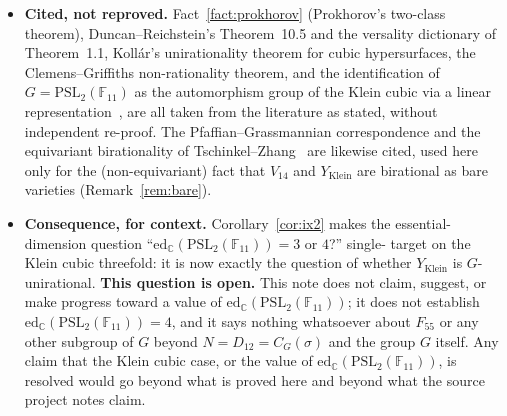 \documentclass[11pt]{article}
\theoremstyle{plain}
\theoremstyle{definition}
\theoremstyle{remark}
\newcommand{\PSL}{\mathrm{PSL}_2(\mathbb{F}_{11})}
\newcommand{\edC}{\mathrm{ed}_{\mathbb C}}
\begin{document}
\begin{itemize}
\item \textbf{Cited, not reproved.} Fact~\ref{fact:prokhorov}
(Prokhorov's two-class theorem), Duncan--Reichstein's Theorem~10.5 and
the versality dictionary of Theorem~1.1, Kollár's unirationality
theorem for cubic hypersurfaces, the Clemens--Griffiths non-rationality
theorem, and the identification of $G=\PSL$ as the automorphism group
of the Klein cubic via a linear representation~\cite{Adler}, are all
taken from the literature as stated, without independent re-proof. The
Pfaffian--Grassmannian correspondence and the equivariant birationality
of Tschinkel--Zhang~\cite{TZ} are likewise cited, used here only for
the (non-equivariant) fact that $V_{14}$ and $Y_{\mathrm{Klein}}$ are
birational as bare varieties (Remark~\ref{rem:bare}).

\item \textbf{Consequence, for context.} Corollary~\ref{cor:ix2} makes
the essential-dimension question ``$\edC(\PSL)=3$ or $4$?'' single-
target on the Klein cubic threefold: it is now exactly the question of
whether $Y_{\mathrm{Klein}}$ is $G$-unirational. \textbf{This question
is open.} This note does not claim, suggest, or make progress toward a
value of $\edC(\PSL)$; it does not establish $\edC(\PSL)=4$, and it says
nothing whatsoever about $F_{55}$ or any other subgroup of $G$ beyond
$N=D_{12}=C_G(\sigma)$ and the group $G$ itself. Any claim that the
Klein cubic case, or the value of $\edC(\PSL)$, is resolved would go
beyond what is proved here and beyond what the source project notes
claim.
\end{itemize}
\end{document}
